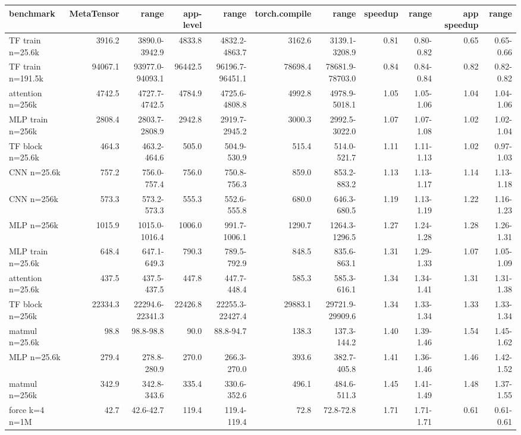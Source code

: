 \begin{tabular}{lrrrrrrrrrr}
\toprule
benchmark & MetaTensor & range & app-level & range & torch.compile & range & speedup & range & app speedup & range \\
\midrule
TF train n=25.6k & 3916.2 & 3890.0-3942.9 & 4833.8 & 4832.2-4863.7 & 3162.6 & 3139.1-3208.9 & 0.81 & 0.80-0.82 & 0.65 & 0.65-0.66 \\
TF train n=191.5k & 94067.1 & 93977.0-94093.1 & 96442.5 & 96196.7-96451.1 & 78698.4 & 78681.9-78703.0 & 0.84 & 0.84-0.84 & 0.82 & 0.82-0.82 \\
attention n=256k & 4742.5 & 4727.7-4742.5 & 4784.9 & 4725.6-4808.8 & 4992.8 & 4978.9-5018.1 & 1.05 & 1.05-1.06 & 1.04 & 1.04-1.06 \\
MLP train n=256k & 2808.4 & 2803.7-2808.9 & 2942.8 & 2919.7-2945.2 & 3000.3 & 2992.5-3022.0 & 1.07 & 1.07-1.08 & 1.02 & 1.02-1.04 \\
TF block n=25.6k & 464.3 & 463.2-464.6 & 505.0 & 504.9-530.9 & 515.4 & 514.0-521.7 & 1.11 & 1.11-1.13 & 1.02 & 0.97-1.03 \\
CNN n=25.6k & 757.2 & 756.0-757.4 & 756.0 & 750.8-756.3 & 859.0 & 853.2-883.2 & 1.13 & 1.13-1.17 & 1.14 & 1.13-1.18 \\
CNN n=256k & 573.3 & 573.2-573.3 & 555.3 & 552.6-555.8 & 680.0 & 646.3-680.5 & 1.19 & 1.13-1.19 & 1.22 & 1.16-1.23 \\
MLP n=256k & 1015.9 & 1015.0-1016.4 & 1006.0 & 991.7-1006.1 & 1290.7 & 1264.3-1296.5 & 1.27 & 1.24-1.28 & 1.28 & 1.26-1.31 \\
MLP train n=25.6k & 648.4 & 647.1-649.3 & 790.3 & 789.5-792.9 & 848.5 & 835.6-863.1 & 1.31 & 1.29-1.33 & 1.07 & 1.05-1.09 \\
attention n=25.6k & 437.5 & 437.5-437.5 & 447.8 & 447.7-448.4 & 585.3 & 585.3-616.1 & 1.34 & 1.34-1.41 & 1.31 & 1.31-1.38 \\
TF block n=256k & 22334.3 & 22294.6-22341.3 & 22426.8 & 22255.3-22427.4 & 29883.1 & 29721.9-29909.6 & 1.34 & 1.33-1.34 & 1.33 & 1.33-1.34 \\
matmul n=25.6k & 98.8 & 98.8-98.8 & 90.0 & 88.8-94.7 & 138.3 & 137.3-144.2 & 1.40 & 1.39-1.46 & 1.54 & 1.45-1.62 \\
MLP n=25.6k & 279.4 & 278.8-280.9 & 270.0 & 266.3-270.0 & 393.6 & 382.7-405.8 & 1.41 & 1.36-1.46 & 1.46 & 1.42-1.52 \\
matmul n=256k & 342.9 & 342.8-343.6 & 335.4 & 330.6-352.6 & 496.1 & 484.6-511.3 & 1.45 & 1.41-1.49 & 1.48 & 1.37-1.55 \\
force k=4 n=1M & 42.7 & 42.6-42.7 & 119.4 & 119.4-119.4 & 72.8 & 72.8-72.8 & 1.71 & 1.71-1.71 & 0.61 & 0.61-0.61 \\

\end{tabular}
